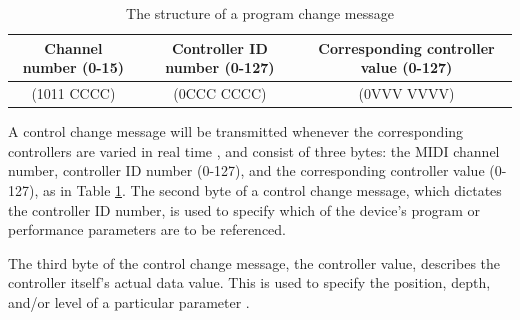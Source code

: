 \begin{table}
	\centering
	\begin{tabular}{|c|c|c|}
	\hline
		Channel number (0-15) & Controller ID number (0-127) & Corresponding controller value (0-127) \\
		\hline
		(1011 CCCC) & (0CCC CCCC) & (0VVV VVVV) \\
	\hline
	\end{tabular}
	\caption{The structure of a program change message}
	\label{tbl:byte-structure-control-change-message}
\end{table}

A control change message will be transmitted whenever the corresponding controllers are varied in real time \cite{Huber_2012}, and consist of three bytes: the MIDI channel number, controller ID number (0-127), and the corresponding controller value (0-127), as in Table \ref{tbl:byte-structure-control-change-message}. The second byte of a control change message, which dictates the controller ID number, is used to specify which of the device's program or performance parameters are to be referenced. 

The third byte of the control change message, the controller value, describes the controller itself's actual data value. This is used to specify the position, depth, and/or level of a particular parameter \cite{Huber_2012}.